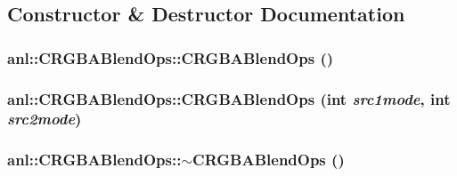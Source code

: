 \subsection{Constructor \& Destructor Documentation}
\hypertarget{classanl_1_1CRGBABlendOps_a19a2b880958c9eaf6fe9a4f2117eba30}{
\subsubsection[{CRGBABlendOps}]{\setlength{\rightskip}{0pt plus 5cm}anl::CRGBABlendOps::CRGBABlendOps ()}}
\label{classanl_1_1CRGBABlendOps_a19a2b880958c9eaf6fe9a4f2117eba30}
\hypertarget{classanl_1_1CRGBABlendOps_a2c5ff29f71ba860ff9299a92052da9fb}{
\subsubsection[{CRGBABlendOps}]{\setlength{\rightskip}{0pt plus 5cm}anl::CRGBABlendOps::CRGBABlendOps (int {\em src1mode}, \/  int {\em src2mode})}}
\label{classanl_1_1CRGBABlendOps_a2c5ff29f71ba860ff9299a92052da9fb}
\hypertarget{classanl_1_1CRGBABlendOps_a037918456406da84cf0fd59450ba67c7}{
\subsubsection[{$\sim$CRGBABlendOps}]{\setlength{\rightskip}{0pt plus 5cm}anl::CRGBABlendOps::$\sim$CRGBABlendOps ()}}
\label{classanl_1_1CRGBABlendOps_a037918456406da84cf0fd59450ba67c7}


